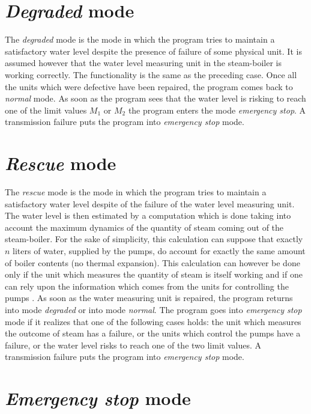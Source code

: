\documentclass{report}
\begin{document}
\section{\emph{Degraded} mode}

The \emph{degraded} mode is the mode in which the program tries to
maintain a satisfactory water level despite the presence of failure of
some physical unit.  It is assumed however that the water level
measuring unit in the steam-boiler is working correctly.  The
functionality is the same as the preceding case.  Once all the units
which were defective have been repaired, the program comes back to
\emph{normal} mode.  As soon as the program sees that the water level
is risking to reach one of the limit values \( M_1 \)\/ or \( M_2 \)\/
the program enters the mode \emph{emergency stop}.  A transmission
failure puts the program into \emph{emergency stop} mode.

\section{\emph{Rescue} mode}

The \emph{rescue} mode is the mode in which the program tries to
maintain a satisfactory water level despite of the failure of the
water level measuring unit.  The water level is then estimated by a
computation which is done taking into account the maximum dynamics of
the quantity of steam coming out of the steam-boiler.  For the sake of
simplicity, this calculation can suppose that exactly \( n \)\/ liters
of water, supplied by the pumps, do account for exactly the same
amount of boiler contents (no thermal expansion).  This calculation
can however be done only if the unit which measures the quantity of
steam is itself working and if one can rely upon the information which
comes from the units for controlling the pumps .  As soon as the water
measuring unit is repaired, the program returns into mode
\emph{degraded} or into mode \emph{normal}.  The program goes into
\emph{emergency stop} mode if it realizes that one of the following
cases holds: the unit which measures the outcome of steam has a
failure, or the units which control the pumps have a failure, or the
water level risks to reach one of the two limit values.  A
transmission failure puts the program into \emph{emergency stop} mode.

\section{\emph{Emergency stop} mode}
\end{document}
